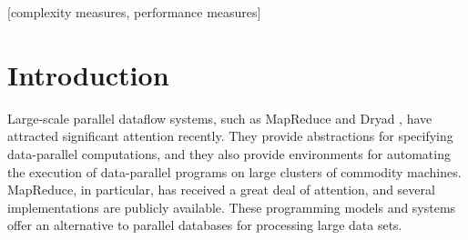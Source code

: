 \documentclass{acm_proc_article-sp}
\begin{document}
\date{30 July 1999}

\maketitle
\begin{abstract}
We propose a model for predicting the optimal performance of large-scale
parallel dataflow systems based on various hardware and workload parameters.
Using this model, we show that existing systems, such as Google's MapReduce
\cite{mapreduce}, Hadoop \cite{hadoop} and Dryad \cite{dryad}, are highly
inefficient, often exhibiting throughput that is more than ten times less than
the predicted optimal throughput for the same hardware and workload. By
implementing Parallel DataSeries (PDS), an efficient open-source parallel
dataflow system, we show that with careful engineering it is possible to
achieve near-optimal performance.    
\end{abstract}

[complexity measures, performance measures]



\section{Introduction}
Large-scale parallel dataflow systems, such as MapReduce \cite{mapreduce} and Dryad \cite{dryad}, have attracted significant attention recently. They provide abstractions for specifying data-parallel computations, and they also provide environments for automating the execution of data-parallel programs on large clusters of commodity machines. MapReduce, in particular, has received a great deal of attention, and several implementations \cite{hadoop, phoenix} are publicly available. These programming models and systems offer an alternative to parallel databases \cite{paralleldatabases} for processing large data sets.
\end{document}
